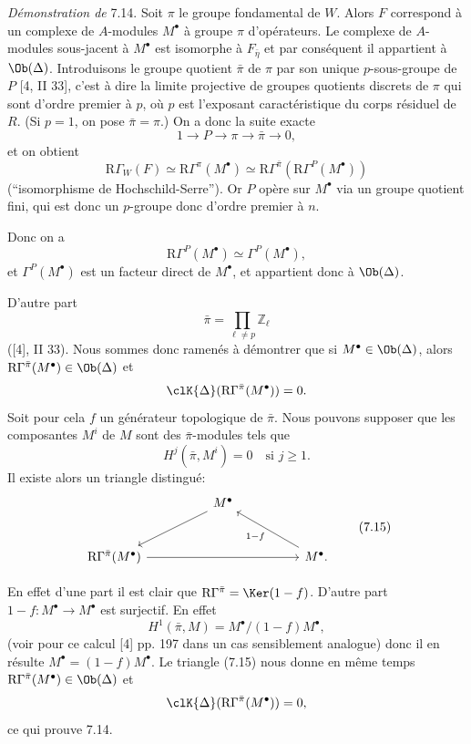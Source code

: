 \emph{Démonstration de} 7.14. Soit $\pi$ le groupe fondamental de $W$. Alors $F$ correspond à un complexe de $A$-modules $M^\bullet$ à groupe $\pi$ d'opérateurs. Le complexe de $A$-modules sous-jacent à $M^\bullet$ est isomorphe à $F_{\bar\eta}$ et par conséquent il appartient à $\Ob(\Delta)$. Introduisons le groupe quotient $\bar\pi$ de $\pi$ par son unique $p$-sous-groupe de  $P$ [4, II 33], c'est à dire la limite projective de groupes quotients discrets de $\pi$ qui sont d'ordre premier à $p$, où $p$ est l'exposant caractéristique du corps résiduel de $R$. (Si $p=1$, on pose $\bar\pi=\pi$.) On a donc la suite exacte
\[
1\longrightarrow P\longrightarrow \pi\longrightarrow \bar\pi\longrightarrow0,
\]
et on obtient
\[
\mathrm{R}\Gamma_W(F)\simeq \mathrm{R}\Gamma^\pi(M^\bullet)
\simeq \mathrm{R}\Gamma^{\bar\pi}(\mathrm{R}\Gamma^P(M^\bullet))
\]
(``isomorphisme de Hochschild-Serre''). Or $P$ opère sur $M^\bullet$ via un groupe quotient fini, qui est donc un $p$-groupe donc d'ordre premier à $n$.

Donc on a
\[
\mathrm{R}\Gamma^P(M^\bullet)\simeq \Gamma^P(M^\bullet),
\]
et $\Gamma^P(M^\bullet)$ est un facteur direct de $M^\bullet$, et appartient donc à $\Ob(\Delta)$.

D'autre part
\[
\bar\pi=\prod_{\ell\ne p}\mathbb{Z}_\ell
\]
([4], II 33). Nous sommes donc ramenés à démontrer que si $M^\bullet\in\Ob(\Delta)$, alors $\mathrm{R}\Gamma^{\bar\pi}(M^\bullet)\in\Ob(\Delta)$ et
\[
\clK{\Delta}(\mathrm{R}\Gamma^{\bar\pi}(M^\bullet))=0.
\]
Soit pour cela $f$ un générateur topologique de $\bar\pi$. Nous pouvons supposer que les composantes $M^i$ de $M$ sont des $\bar\pi$-modules tels que
\[
H^j(\bar\pi,M^i)=0\quad\text{si }j\ge1.
\]
Il existe alors un triangle distingué:
\[
\begin{tikzcd}[column sep=huge,row sep=large]
& M^\bullet \arrow[dl] &\\
\mathrm{R}\Gamma^{\bar\pi}(M^\bullet) \arrow[rr] && M^\bullet \arrow[ul,"1-f"].
\end{tikzcd}
\tag{7.15}
\]

En effet d'une part il est clair que $\mathrm{R}\Gamma^{\bar\pi}=\Ker(1-f)$. D'autre part $1-f:M^\bullet\to M^\bullet$ est surjectif. En effet
\[
H^1(\bar\pi,M)=M^\bullet/(1-f)M^\bullet,
\]
(voir pour ce calcul [4] pp. 197 dans un cas sensiblement analogue) donc il en résulte $M^\bullet=(1-f)M^\bullet$. Le triangle (7.15) nous donne en même temps $\mathrm{R}\Gamma^{\bar\pi}(M^\bullet)\in\Ob(\Delta)$ et
\[
\clK{\Delta}(\mathrm{R}\Gamma^{\bar\pi}(M^\bullet))=0,
\]
ce qui prouve 7.14.

